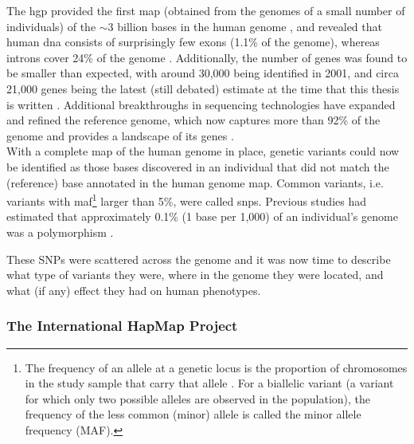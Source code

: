 The \gls{hgp} provided the first map (obtained from the genomes of a small number of individuals) of the $\sim$3 billion bases in the human genome \cite{lander2001initial, schmutz2004quality, hattori2005finishing}, and revealed that human \gls{dna} consists of surprisingly few exons (1.1\% of the genome), whereas introns cover 24\% of the genome \cite{venter2001sequence, lander2001initial}. 
Additionally, the number of genes was found to be smaller than expected, with around 30,000 being identified in 2001, and circa 21,000 genes being the latest (still debated) estimate at the time that this thesis is written \cite{pertea2018thousands}. 
Additional breakthroughs in sequencing technologies have expanded and refined the reference genome, which now captures more than 92\% of the genome and provides a landscape of its genes \cite{lander2011initial}.\\

With a complete map of the human genome in place, genetic variants could now be identified as those bases discovered in an individual that did not match the (reference) base annotated in the human genome map. 
Common variants, i.e. variants with \gls{maf}\footnote{The frequency of an
allele at a genetic locus is the proportion of chromosomes in the study sample that carry that allele \cite{laird2010fundamentals}. 
For a biallelic variant (a variant for which only two possible alleles are observed in the population), the frequency of the less common (minor) allele is called the minor allele frequency (MAF).} larger than 5\%, were called \glspl{snp}. 
Previous studies had estimated that approximately 0.1\% (1 base per 1,000) of an individual's genome was a polymorphism \cite{wang1998large, li1991low, cargill1999characterization}. 

These SNPs were scattered across the genome and it was now time to describe what type of variants they were, where in the genome they were located, and what (if any) effect they had on human phenotypes.

\subsubsection{The International HapMap Project}

